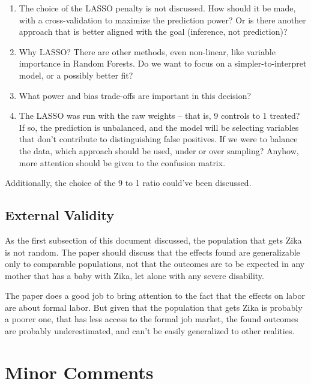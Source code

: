 \documentclass[12pt]{article}
\begin{document}
\begin{enumerate}
    \item The choice of the LASSO penalty is not discussed. How should it be made, with a cross-validation to maximize the prediction power? Or is there another approach that is better aligned with the goal (inference, not prediction)?
    \item Why LASSO? There are other methods, even non-linear, like variable importance in Random Forests. Do we want to focus on a simpler-to-interpret model, or a possibly better fit?
    \item What power and bias trade-offs are important in this decision?
    \item The LASSO was run with the raw weights -- that is, 9 controls to 1 treated? If so, the prediction is unbalanced, and the model will be selecting variables that don't contribute to distinguishing false positives. If we were to balance the data, which approach should be used, under or over sampling? Anyhow, more attention should be given to the confusion matrix.
\end{enumerate}

Additionally, the choice of the 9 to 1 ratio could've been discussed.


\subsection{External Validity}

As the first subsection of this document discussed, the population that gets Zika is not random. The paper should discuss that the effects found are generalizable only to comparable populations, not that the outcomes are to be expected in any mother that has a baby with Zika, let alone with any severe disability.

The paper does a good job to bring attention to the fact that the effects on labor are about formal labor. But given that the population that gets Zika is probably a poorer one, that has less access to the formal job market, the found outcomes are probably underestimated, and can't be easily generalized to other realities.



\section{Minor Comments}
\end{document}
